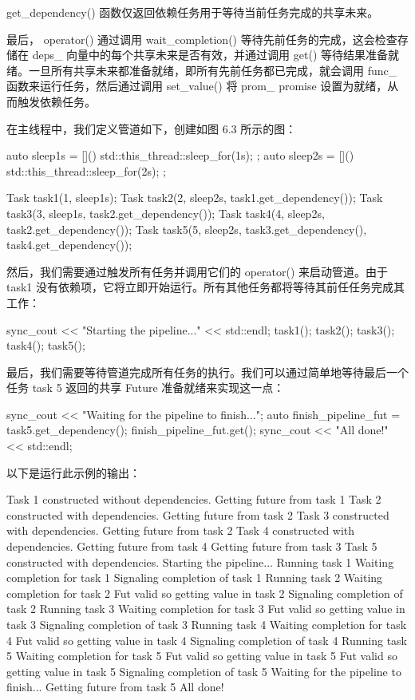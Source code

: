 get\_dependency() 函数仅返回依赖任务用于等待当前任务完成的共享未来。

最后， operator() 通过调用 wait\_completion() 等待先前任务的完成，这会检查存储在 deps\_ 向量中的每个共享未来是否有效，并通过调用 get() 等待结果准备就绪。一旦所有共享未来都准备就绪，即所有先前任务都已完成，就会调用 func\_ 函数来运行任务，然后通过调用 set\_value() 将 prom\_ promise 设置为就绪，从而触发依赖任务。

在主线程中，我们定义管道如下，创建如图 6.3 所示的图：

\begin{cpp}
auto sleep1s = []() { std::this_thread::sleep_for(1s); };
auto sleep2s = []() { std::this_thread::sleep_for(2s); };

Task task1(1, sleep1s);
Task task2(2, sleep2s, task1.get_dependency());
Task task3(3, sleep1s, task2.get_dependency());
Task task4(4, sleep2s, task2.get_dependency());
Task task5(5, sleep2s, task3.get_dependency(),
                       task4.get_dependency());
\end{cpp}

然后，我们需要通过触发所有任务并调用它们的 operator() 来启动管道。由于 task1 没有依赖项，它将立即开始运行。所有其他任务都将等待其前任任务完成其工作：

\begin{cpp}
sync_cout << "Starting the pipeline..." << std::endl;
task1();
task2();
task3();
task4();
task5();
\end{cpp}

最后，我们需要等待管道完成所有任务的执行。我们可以通过简单地等待最后一个任务 task 5 返回的共享 Future 准备就绪来实现这一点：

\begin{cpp}
sync_cout << "Waiting for the pipeline to finish...\n";
auto finish_pipeline_fut = task5.get_dependency();
finish_pipeline_fut.get();
sync_cout << "All done!" << std::endl;
\end{cpp}

以下是运行此示例的输出：

\begin{shell}
Task 1 constructed without dependencies.
Getting future from task 1
Task 2 constructed with dependencies.
Getting future from task 2
Task 3 constructed with dependencies.
Getting future from task 2
Task 4 constructed with dependencies.
Getting future from task 4
Getting future from task 3
Task 5 constructed with dependencies.
Starting the pipeline...
Running task 1
Waiting completion for task 1
Signaling completion of task 1
Running task 2
Waiting completion for task 2
Fut valid so getting value in task 2
Signaling completion of task 2
Running task 3
Waiting completion for task 3
Fut valid so getting value in task 3
Signaling completion of task 3
Running task 4
Waiting completion for task 4
Fut valid so getting value in task 4
Signaling completion of task 4
Running task 5
Waiting completion for task 5
Fut valid so getting value in task 5
Fut valid so getting value in task 5
Signaling completion of task 5
Waiting for the pipeline to finish...
Getting future from task 5
All done!
\end{shell}

